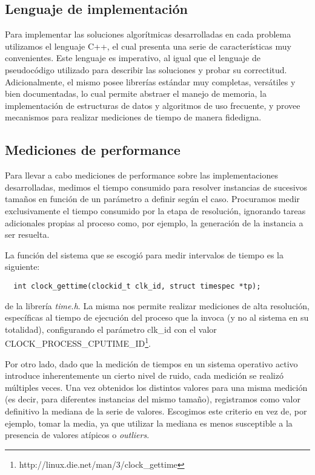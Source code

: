 \subsection{Lenguaje de implementación}

Para implementar las soluciones algorítmicas desarrolladas en cada problema utilizamos el lenguaje C++, el cual presenta una serie de características muy convenientes. Este lenguaje es imperativo, al igual que el lenguaje de pseudocódigo utilizado para describir las soluciones y probar su correctitud. Adicionalmente, el mismo posee librerías estándar muy completas, versátiles y bien documentadas, lo cual permite abstraer el manejo de memoria, la implementación de estructuras de datos y algoritmos de uso frecuente, y provee mecanismos para realizar mediciones de tiempo de manera fidedigna.

\subsection{Mediciones de performance}
\label{consideraciones-mediciones}

Para llevar a cabo mediciones de performance sobre las implementaciones desarrolladas, medimos el tiempo consumido para resolver instancias de sucesivos tamaños en función de un parámetro a definir según el caso. Procuramos medir exclusivamente el tiempo consumido por la etapa de resolución, ignorando tareas adicionales propias al proceso como, por ejemplo, la generación de la instancia a ser resuelta.

La función del sistema que se escogió para medir intervalos de tiempo es la siguiente:

\begin{verbatim}
  int clock_gettime(clockid_t clk_id, struct timespec *tp);
\end{verbatim}

de la librería \emph{time.h}. La misma nos permite realizar mediciones de alta resolución, específicas al tiempo de ejecución del proceso que la invoca (y no al sistema en su totalidad), configurando el parámetro clk\_id con el valor CLOCK\_PROCESS\_CPUTIME\_ID\footnote{http://linux.die.net/man/3/clock\_gettime}.

Por otro lado, dado que la medición de tiempos en un sistema operativo activo introduce inherentemente un cierto nivel de ruido, cada medición se realizó múltiples veces. Una vez obtenidos los distintos valores para una misma medición (es decir, para diferentes instancias del mismo tamaño), registramos como valor definitivo la mediana de la serie de valores. Escogimos este criterio en vez de, por ejemplo, tomar la media, ya que utilizar la mediana es menos susceptible a la presencia de valores atípicos o \emph{outliers}.